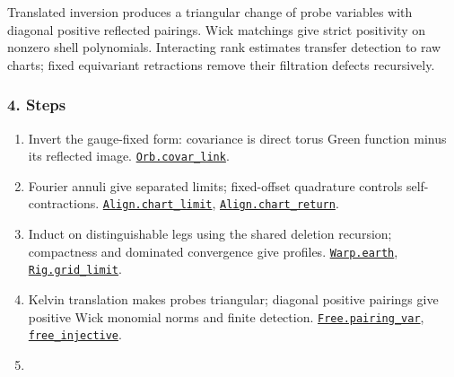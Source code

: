 \documentclass[
  letterpaper,
  11pt]{article}
\providecommand{\tightlist}{%
  \setlength{\itemsep}{0pt}\setlength{\parskip}{0pt}}
\begin{document}
Translated inversion produces a triangular change of probe variables
with diagonal positive reflected pairings. Wick matchings give strict
positivity on nonzero shell polynomials. Interacting rank estimates
transfer detection to raw charts; fixed equivariant retractions remove
their filtration defects recursively.

\subsubsection{4. Steps}\label{steps-25}

\begin{enumerate}
\def\labelenumi{\arabic{enumi}.}
\tightlist
\item
  Invert the gauge-fixed form: covariance is direct torus Green function
  minus its reflected image.
  \href{https://github.com/yang-mills-group/OpenAI-YM-20261028/blob/3456e5e75cf8d4cd558955a5c7638fba2d68f464/YM/Pert/Fourier/Source.lean\#L55-L59}{\texttt{Orb.covar\_link}}.
\item
  Fourier annuli give separated limits; fixed-offset quadrature controls
  self-contractions.
  \href{https://github.com/yang-mills-group/OpenAI-YM-20261028/blob/3456e5e75cf8d4cd558955a5c7638fba2d68f464/YM/Pert/Align/Bilateral.lean\#L75-L83}{\texttt{Align.chart\_limit}},
  \href{https://github.com/yang-mills-group/OpenAI-YM-20261028/blob/3456e5e75cf8d4cd558955a5c7638fba2d68f464/YM/Pert/Align/Bilateral.lean\#L85-L89}{\texttt{Align.chart\_return}}.
\item
  Induct on distinguishable legs using the shared deletion recursion;
  compactness and dominated convergence give profiles.
  \href{https://github.com/yang-mills-group/OpenAI-YM-20261028/blob/3456e5e75cf8d4cd558955a5c7638fba2d68f464/YM/Pert/Warp/Approach.lean\#L19-L32}{\texttt{Warp.earth}},
  \href{https://github.com/yang-mills-group/OpenAI-YM-20261028/blob/3456e5e75cf8d4cd558955a5c7638fba2d68f464/YM/Pert/Rig/Tested.lean\#L23-L52}{\texttt{Rig.grid\_limit}}.
\item
  Kelvin translation makes probes triangular; diagonal positive pairings
  give positive Wick monomial norms and finite detection.
  \href{https://github.com/yang-mills-group/OpenAI-YM-20261028/blob/3456e5e75cf8d4cd558955a5c7638fba2d68f464/YM/Push/FINITE_DETECTION/Variables.lean\#L114-L118}{\texttt{Free.pairing\_var}},
  \href{https://github.com/yang-mills-group/OpenAI-YM-20261028/blob/3456e5e75cf8d4cd558955a5c7638fba2d68f464/YM/Push/FINITE_DETECTION/Test.lean\#L77-L85}{\texttt{free\_injective}}.
\item

\end{enumerate}
\end{document}
